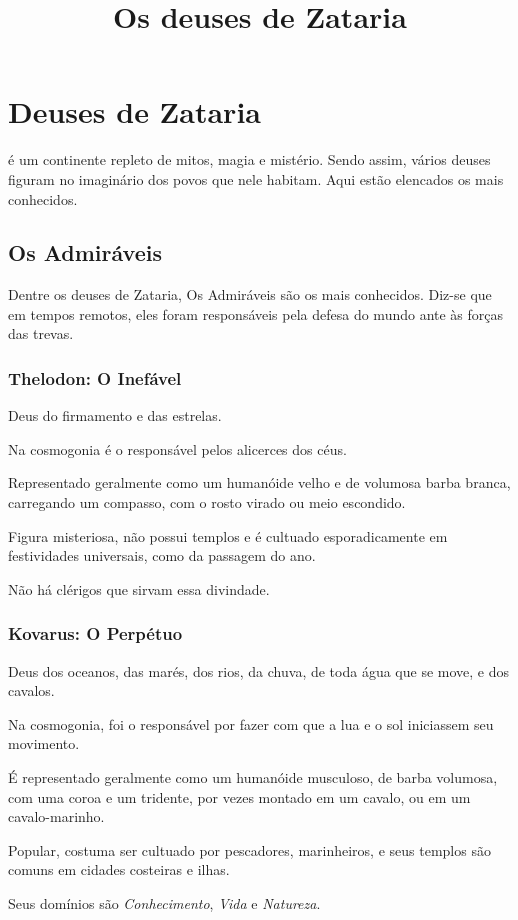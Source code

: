 \documentclass[letterpaper,twocolumn,openany]{dndbook}
\title{Os deuses de Zataria}
\begin{document}
	
	\chapter*{Deuses de Zataria}
	
	 é um continente repleto de mitos, magia e mistério. Sendo assim, vários deuses figuram no imaginário dos povos que nele habitam. Aqui estão elencados os mais conhecidos.
	
	\section{Os Admiráveis}
	Dentre os deuses de Zataria, Os Admiráveis são os mais conhecidos. Diz-se que em tempos remotos, eles foram responsáveis pela defesa do mundo ante às forças das trevas.
	
	\subsection{Thelodon: O Inefável}
	Deus do firmamento e das estrelas.
	\par Na cosmogonia é o responsável pelos alicerces dos céus. 
	\par Representado geralmente como um humanóide velho e de volumosa barba branca, carregando um compasso, com o rosto virado ou meio escondido.
	\par Figura misteriosa, não possui templos e é cultuado esporadicamente em festividades universais, como da passagem do ano.
	\par Não há clérigos que sirvam essa divindade.
	
	\subsection{Kovarus: O Perpétuo}
	Deus dos oceanos, das marés, dos rios, da chuva, de toda água que se move, e dos cavalos.
	\par Na cosmogonia, foi o responsável por fazer com que a lua e o sol iniciassem seu movimento. 
	\par É representado geralmente como um humanóide musculoso, de barba volumosa, com uma coroa e um tridente, por vezes montado em um cavalo, ou em um cavalo-marinho.
	\par Popular, costuma ser cultuado por pescadores, marinheiros, e seus templos são comuns em cidades costeiras e ilhas.
	\par Seus domínios são \textit{Conhecimento}, \textit{Vida} e \textit{Natureza}.
\end{document}
